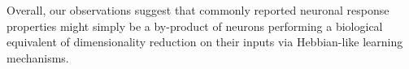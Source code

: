 Overall, our observations suggest that 
commonly reported neuronal response properties might simply be a 
by-product of neurons performing a biological equivalent of 
dimensionality reduction on their inputs 
via Hebbian-like learning mechanisms.





